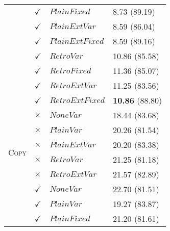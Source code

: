 \begin{table}
\begin{tabular}{|l|l|l|l| }
 & $\checkmark$ & $PlainFixed$ &  8.73 (89.19)\\
 & $\checkmark$ & $PlainExtVar$  & 8.59 (86.04) \\
 & $\checkmark$ & $PlainExtFixed$  & 8.59 (89.16) \\
 & $\checkmark$ & $RetroVar$ &  10.86 (85.58) \\
 & $\checkmark$ & $RetroFixed$ &  11.36 (85.07) \\
 & $\checkmark$ & $RetroExtVar$  & 11.25 (83.56) \\
 & $\checkmark$ & $RetroExtFixed$  & \textbf{10.86} (88.80) \\  \hline
\multirow{6}{*}{\textsc{Copy}} & $\times$ & $NoneVar$ & 18.44 (83.68) \\
 & $\times$ & $PlainVar$ & 20.26 (81.54) \\ %
 & $\times$ & $PlainExtVar$  & 20.20 (83.38)\\ 
 & $\times$ & $RetroVar$ &  21.25 (81.18) \\
 & $\times$ & $RetroExtVar$  & 21.57 (82.89) \\
  & $\checkmark$ & $NoneVar$ &  22.70 (81.51) \\
 & $\checkmark$ & $PlainVar$ &  19.27 (83.87) \\ 
 & $\checkmark$ & $PlainFixed$ &  21.20 (81.61) \\

\end{tabular}
\end{table}
